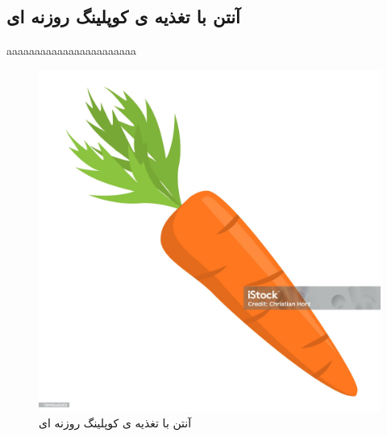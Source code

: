 \subsection{آنتن با تغذیه ی کوپلینگ روزنه ای}
aaaaaaaaaaaaaaaaaaaaaaa
\begin{figure}
	\centering
	\includegraphics[scale=0.3]{Images/aaa.jpg}
	\caption{آنتن با تغذیه ی کوپلینگ روزنه ای}
	\label{fig4}
\end{figure}

